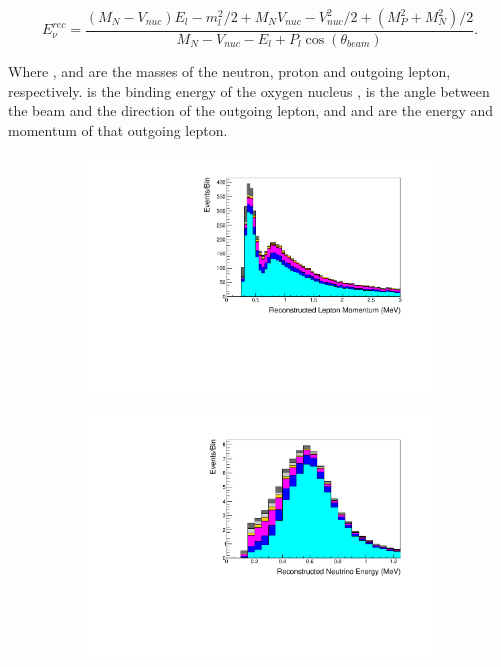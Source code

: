 \begin{equation}
  \label{sec:SelsAndSysts_Erec_CCQE}
  E^{rec}_{\nu} = \frac{(M_{N}-V_{nuc})E_{l} - m_{l}^{2}/2 + M_{N}V_{nuc} - V_{nuc}^{2}/2 + (M_{P}^{2} + M_{N}^{2})/2}{M_{N} - V_{nuc} - E_{l} + P_{l}\cos(\theta_{beam})}.
\end{equation}

Where ,  and  are the masses of the neutron, proton and outgoing lepton, respectively.  is the binding energy of the oxygen nucleus \cite{t2k_tn_399},  is the angle between the beam and the direction of the outgoing lepton, and  and  are the energy and momentum of that outgoing lepton.

\begin{figure}[h]
  \begin{subfigure}[t]{0.49\textwidth}
    \includegraphics[width=\textwidth, trim={0mm 0mm 0mm 0mm}, clip,page=1]{Figures/Selections/FHC1Rmu-2020_X.pdf}
  \end{subfigure}%
  \begin{subfigure}[t]{0.49\textwidth}
    \includegraphics[width=\textwidth, trim={0mm 0mm 0mm 0mm}, clip,page=1]{Figures/Selections/FHC1Re-2020_X.pdf}

\end{subfigure}
\end{figure}
